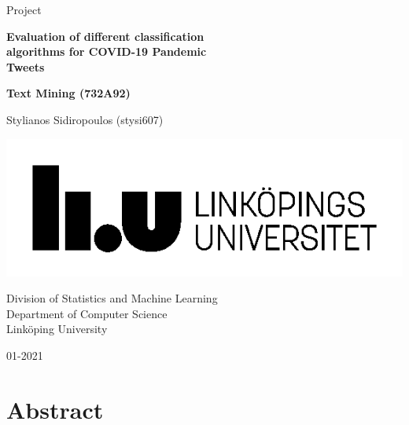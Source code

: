\documentclass[
]{article}
\author{}
\date{\vspace{-2.5em}}
\begin{document}
\begin{titlepage}
	\clearpage\thispagestyle{empty}
	\centering
	\vspace{2cm}

	{\large Project \par}
	\vspace{3cm}
	{\Huge \textbf{Evaluation of different classification \\ algorithms for COVID-19 Pandemic \\ Tweets}} \\
	\vspace{1cm}
	{\large \textbf{Text Mining (732A92)} \par}
	\vspace{3cm}
	{\normalsize Stylianos Sidiropoulos (stysi607) \par}
	\vspace{2cm}

    \includegraphics{liu_logo.png}
    
    \vspace{2cm}
    
	{\normalsize Division of Statistics and Machine Learning \\ 
		Department of Computer Science \\
		Linköping University \par}
		
	{\normalsize 01-2021 \par}
	\vspace{2cm}
	
	\pagebreak

\end{titlepage}

\tableofcontents{}

\clearpage

\hypertarget{abstract}{%
\section{Abstract}\label{abstract}}
\end{document}
